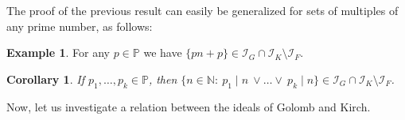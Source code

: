 \documentclass{amsart}
\newtheorem{cor}[thm]{Corollary}
\theoremstyle{definition}
\newtheorem{problem}[thm]{Problem}
\theoremstyle{definition}
\newtheorem{ex}[thm]{Example}
\newcommand{\N}{{\mathbb N}}
\newcommand{\I}{\mathcal I}
\begin{document}
The proof of the previous result can easily be generalized for sets of multiples of any prime number, as follows:

\begin{ex} 
For any $p\in\mathbb{P}$ we have $\{pn+p\}\in \I_G \cap \I_K \setminus \I_F$.
\end{ex}


\begin{cor}
If $p_1, \ldots, p_k \in \mathbb{P}$, then $\{n\in\N :\ p_1\mid n\ \vee \ldots \vee\ p_k\mid n\}\in \I_G \cap \I_K \setminus \I_F$.
\end{cor}

Now, let us investigate a relation between the ideals of Golomb and Kirch.
\end{document}
